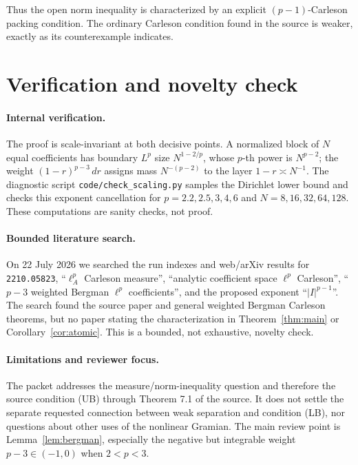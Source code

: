 \documentclass[11pt]{article}
\newcommand{\dd}{\,d}
\begin{document}
Thus the open norm inequality is characterized by an explicit
$(p-1)$-Carleson packing condition.  The ordinary Carleson condition found in
the source is weaker, exactly as its counterexample indicates.

\section{Verification and novelty check}

\paragraph{Internal verification.}
The proof is scale-invariant at both decisive points.  A normalized block of
$N$ equal coefficients has boundary $L^p$ size $N^{1-2/p}$, whose $p$-th
power is $N^{p-2}$; the weight $(1-r)^{p-3}\dd r$ assigns mass
$N^{-(p-2)}$ to the layer $1-r\asymp N^{-1}$.  The diagnostic script
\texttt{code/check\_scaling.py} samples the Dirichlet lower bound and checks
this exponent cancellation for $p=2.2,2.5,3,4,6$ and
$N=8,16,32,64,128$.  These computations are sanity checks, not proof.

\paragraph{Bounded literature search.}
On 22 July 2026 we searched the run indexes and web/arXiv results for
\texttt{2210.05823}, ``$\ell_A^p$ Carleson measure'', ``analytic coefficient
space $\ell^p$ Carleson'', ``$p-3$ weighted Bergman $\ell^p$ coefficients'',
and the proposed exponent ``$|I|^{p-1}$''.  The search found the source paper
and general weighted Bergman Carleson theorems, but no paper stating the
characterization in Theorem~\ref{thm:main} or Corollary~\ref{cor:atomic}.
This is a bounded, not exhaustive, novelty check.

\paragraph{Limitations and reviewer focus.}
The packet addresses the measure/norm-inequality question and therefore the
source condition (UB) through Theorem 7.1 of the source.  It does not settle
the separate requested connection between weak separation and condition (LB),
nor questions about other uses of the nonlinear Gramian.  The main review
point is Lemma~\ref{lem:bergman}, especially the negative but integrable weight
$p-3\in(-1,0)$ when $2<p<3$.
\end{document}
